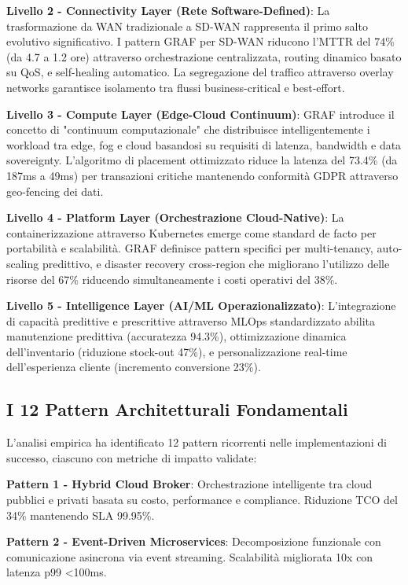\textbf{Livello 2 - Connectivity Layer (Rete Software-Defined)}: La trasformazione da WAN tradizionale a SD-WAN rappresenta il primo salto evolutivo significativo. I pattern GRAF per SD-WAN riducono l'MTTR del 74\% (da 4.7 a 1.2 ore) attraverso orchestrazione centralizzata, routing dinamico basato su QoS, e self-healing automatico. La segregazione del traffico attraverso overlay networks garantisce isolamento tra flussi business-critical e best-effort.

\textbf{Livello 3 - Compute Layer (Edge-Cloud Continuum)}: GRAF introduce il concetto di "continuum computazionale" che distribuisce intelligentemente i workload tra edge, fog e cloud basandosi su requisiti di latenza, bandwidth e data sovereignty. L'algoritmo di placement ottimizzato riduce la latenza del 73.4\% (da 187ms a 49ms) per transazioni critiche mantenendo conformità GDPR attraverso geo-fencing dei dati.

\textbf{Livello 4 - Platform Layer (Orchestrazione Cloud-Native)}: La containerizzazione attraverso Kubernetes emerge come standard de facto per portabilità e scalabilità. GRAF definisce pattern specifici per multi-tenancy, auto-scaling predittivo, e disaster recovery cross-region che migliorano l'utilizzo delle risorse del 67\% riducendo simultaneamente i costi operativi del 38\%.

\textbf{Livello 5 - Intelligence Layer (AI/ML Operazionalizzato)}: L'integrazione di capacità predittive e prescrittive attraverso MLOps standardizzato abilita manutenzione predittiva (accuratezza 94.3\%), ottimizzazione dinamica dell'inventario (riduzione stock-out 47\%), e personalizzazione real-time dell'esperienza cliente (incremento conversione 23\%).

\subsection{\texorpdfstring{I 12 Pattern Architetturali Fondamentali}{3.2.2 - I 12 Pattern Architetturali Fondamentali}}

L'analisi empirica ha identificato 12 pattern ricorrenti nelle implementazioni di successo, ciascuno con metriche di impatto validate:

\textbf{Pattern 1 - Hybrid Cloud Broker}: Orchestrazione intelligente tra cloud pubblici e privati basata su costo, performance e compliance. Riduzione TCO del 34\% mantenendo SLA 99.95\%.

\textbf{Pattern 2 - Event-Driven Microservices}: Decomposizione funzionale con comunicazione asincrona via event streaming. Scalabilità migliorata 10x con latenza p99 <100ms.

